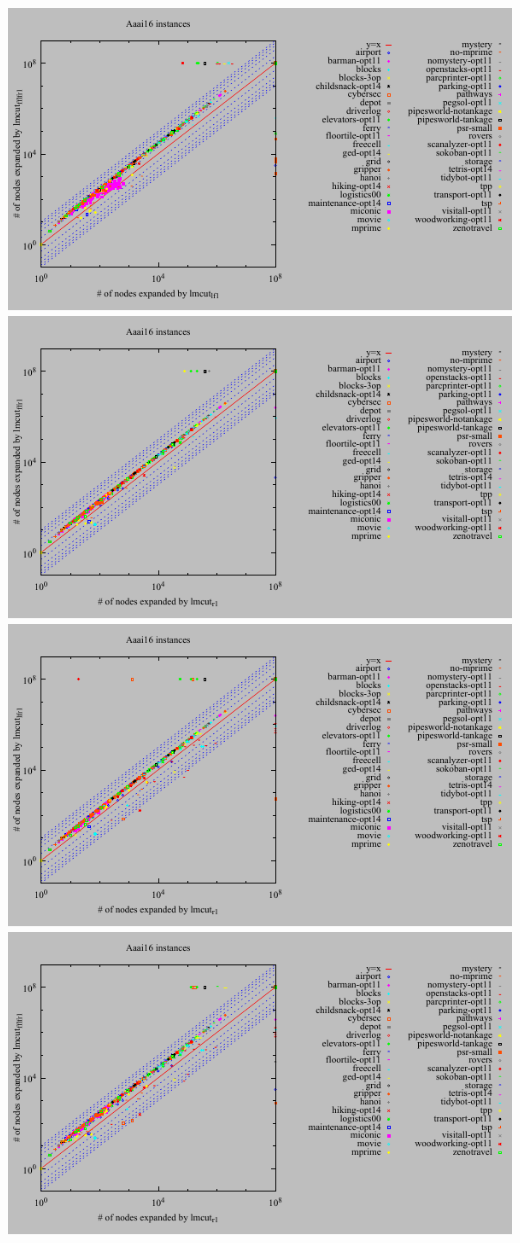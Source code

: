 \includegraphics{tables/aaai16-expanded-lmcut_lf-lmcut_fflfr.pdf}
\linebreak
\includegraphics{tables/aaai16-expanded-lmcut_r-lmcut_ffr.pdf}
\linebreak
\includegraphics{tables/aaai16-expanded-lmcut_r-lmcut_lfr.pdf}
\linebreak
\includegraphics{tables/aaai16-expanded-lmcut_r-lmcut_fflfr.pdf}
\linebreak
